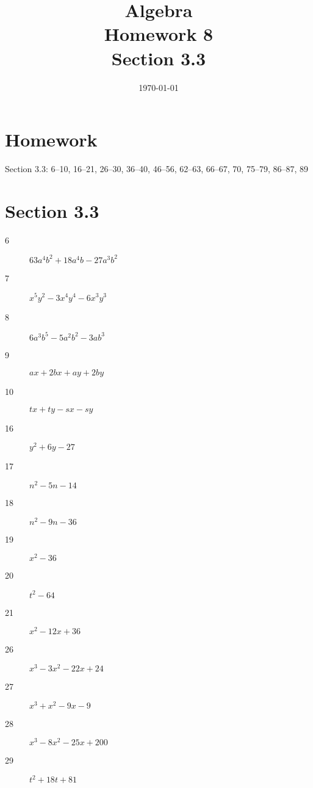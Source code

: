 \documentclass[letterpaper]{exam}
\title{Algebra \\ Homework 8 \\ Section 3.3 }
\author{}
\date{\today}
\begin{document}
  \maketitle

  \section{Homework}

  Section 3.3: 6--10, 16--21, 26--30, 36--40, 46--56, 62--63, 66--67, 70, 75--79, 86--87, 89


  \ifprintanswers{}
    \section{Section 3.3} %
    
    \begin{description}
      \item[6] $63 a^4 b^2 + 18 a^4 b - 27 a^3 b^2$ 

      \item[7] $x^5 y^2 - 3 x^4 y^4 - 6 x^3 y^3$ 

      \item[8] $6 a^3 b^5 - 5 a^2 b^2 - 3 a b^3$ 

      \item[9] $ax + 2bx + ay + 2by$

      \item[10] $tx + ty -sx - sy$


      \item[16] $y^2 + 6y - 27$

      \item[17] $n^2 - 5n - 14$

      \item[18] $n^2 - 9n - 36$

      \item[19] $x^2 - 36$

      \item[20] $t^2 - 64$

      \item[21] $x^2 - 12x + 36$

      \item[26] $x^3 - 3 x^2 - 22 x + 24$

      \item[27] $x^3 + x^2 - 9x - 9$

      \item[28] $x^3 - 8 x^2 - 25 x + 200$

      \item[29] $t^2 + 18t + 81$


\end{description}
\end{document}
